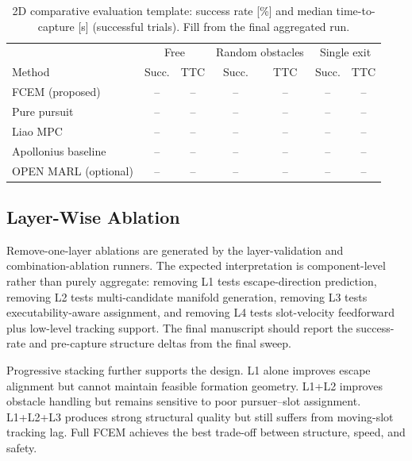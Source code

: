 \documentclass[journal]{IEEEtran}
\begin{document}
\begin{table}[!t]
  \caption{2D comparative evaluation template: success rate [\%] and median time-to-capture [s] (successful trials). Fill from the final aggregated run.}
  \label{tab:comparison}
  \centering
  \small
  \begin{tabular}{@{}l|cc|cc|cc@{}}
    \toprule
    & \multicolumn{2}{c|}{Free} & \multicolumn{2}{c|}{Random obstacles} & \multicolumn{2}{c}{Single exit} \\
    Method & Succ. & TTC & Succ. & TTC & Succ. & TTC \\
    \midrule
    FCEM (proposed)        & -- & -- & -- & -- & -- & -- \\
    Pure pursuit           & -- & -- & -- & -- & -- & -- \\
    Liao MPC               & -- & -- & -- & -- & -- & -- \\
    Apollonius baseline    & -- & -- & -- & -- & -- & -- \\
    OPEN MARL (optional)   & -- & -- & -- & -- & -- & -- \\
    \bottomrule
  \end{tabular}
\end{table}

\subsection{Layer-Wise Ablation}
\label{sec:layer_ablation}

Remove-one-layer ablations are generated by the layer-validation and combination-ablation runners.
The expected interpretation is component-level rather than purely aggregate: removing L1 tests escape-direction prediction, removing L2 tests multi-candidate manifold generation, removing L3 tests executability-aware assignment, and removing L4 tests slot-velocity feedforward plus low-level tracking support.
The final manuscript should report the success-rate and pre-capture structure deltas from the final sweep.

Progressive stacking further supports the design.
L1 alone improves escape alignment but cannot maintain feasible formation geometry.
L1+L2 improves obstacle handling but remains sensitive to poor pursuer--slot assignment.
L1+L2+L3 produces strong structural quality but still suffers from moving-slot tracking lag.
Full FCEM achieves the best trade-off between structure, speed, and safety.
\end{document}
